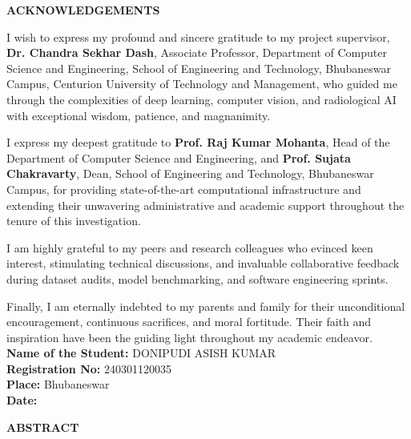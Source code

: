 \documentclass[12pt, a4paper]{report}
\begin{document}
\newpage
\thispagestyle{plain}
\begin{center}
    {\Large \textbf{ACKNOWLEDGEMENTS}}\\[1.0cm]
\end{center}

I wish to express my profound and sincere gratitude to my project supervisor, \textbf{Dr. Chandra Sekhar Dash}, Associate Professor, Department of Computer Science and Engineering, School of Engineering and Technology, Bhubaneswar Campus, Centurion University of Technology and Management, who guided me through the complexities of deep learning, computer vision, and radiological AI with exceptional wisdom, patience, and magnanimity.

I express my deepest gratitude to \textbf{Prof. Raj Kumar Mohanta}, Head of the Department of Computer Science and Engineering, and \textbf{Prof. Sujata Chakravarty}, Dean, School of Engineering and Technology, Bhubaneswar Campus, for providing state-of-the-art computational infrastructure and extending their unwavering administrative and academic support throughout the tenure of this investigation.

I am highly grateful to my peers and research colleagues who evinced keen interest, stimulating technical discussions, and invaluable collaborative feedback during dataset audits, model benchmarking, and software engineering sprints.

Finally, I am eternally indebted to my parents and family for their unconditional encouragement, continuous sacrifices, and moral fortitude. Their faith and inspiration have been the guiding light throughout my academic endeavor.\\[1.5cm]

\noindent
\textbf{Name of the Student:} DONIPUDI ASISH KUMAR\\[0.3cm]
\textbf{Registration No:} 240301120035\\[0.3cm]
\textbf{Place:} Bhubaneswar\\[0.3cm]
\textbf{Date:}

\newpage
\thispagestyle{plain}
\begin{center}
    {\Large \textbf{ABSTRACT}}\\[1.0cm]
\end{center}
\end{document}

